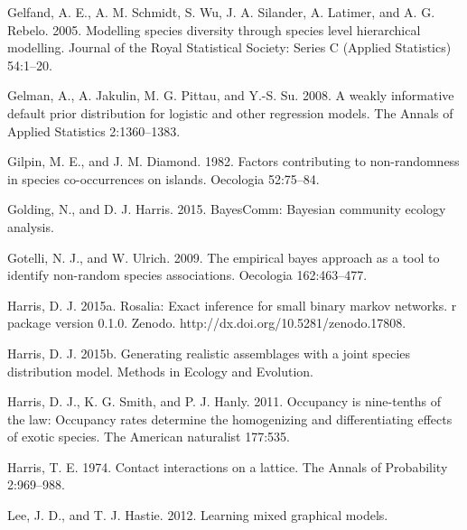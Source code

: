 \documentclass[12pt,]{article}
\begin{document}
\begin{spacing}{1.9}
\begin{flushleft}
Gelfand, A. E., A. M. Schmidt, S. Wu, J. A. Silander, A. Latimer, and A.
G. Rebelo. 2005. Modelling species diversity through species level
hierarchical modelling. Journal of the Royal Statistical Society: Series
C (Applied Statistics) 54:1--20.

Gelman, A., A. Jakulin, M. G. Pittau, and Y.-S. Su. 2008. A weakly
informative default prior distribution for logistic and other regression
models. The Annals of Applied Statistics 2:1360--1383.

Gilpin, M. E., and J. M. Diamond. 1982. Factors contributing to
non-randomness in species co-occurrences on islands. Oecologia
52:75--84.

Golding, N., and D. J. Harris. 2015. BayesComm: Bayesian community
ecology analysis.

Gotelli, N. J., and W. Ulrich. 2009. The empirical bayes approach as a
tool to identify non-random species associations. Oecologia
162:463--477.

Harris, D. J. 2015a. Rosalia: Exact inference for small binary markov
networks. r package version 0.1.0. Zenodo.
http://dx.doi.org/10.5281/zenodo.17808.

Harris, D. J. 2015b. Generating realistic assemblages with a joint
species distribution model. Methods in Ecology and Evolution.

Harris, D. J., K. G. Smith, and P. J. Hanly. 2011. Occupancy is
nine-tenths of the law: Occupancy rates determine the homogenizing and
differentiating effects of exotic species. The American naturalist
177:535.

Harris, T. E. 1974. Contact interactions on a lattice. The Annals of
Probability 2:969--988.

Lee, J. D., and T. J. Hastie. 2012. Learning mixed graphical models.


\end{flushleft}
\end{spacing}
\end{document}
